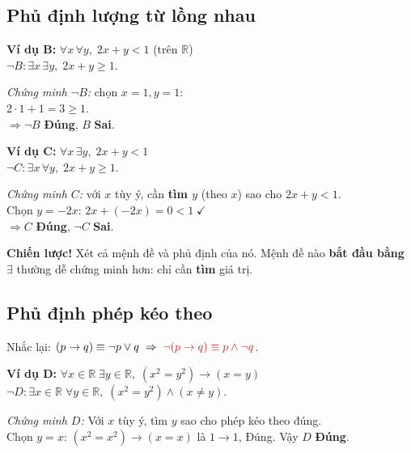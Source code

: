 \documentclass[12pt,a4paper]{article}
\begin{document}
\subsection{Phủ định lượng từ lồng nhau}

\noindent
\begin{minipage}[t]{0.47\textwidth}
\textbf{Ví dụ B:} $\forall x\,\forall y,\; 2x + y < 1$ (trên $\mathbb{R}$)\\
$\neg B : \exists x\,\exists y,\; 2x + y \ge 1$.

\textit{Chứng minh $\neg B$:} chọn $x = 1, y = 1$:\\
$2 \cdot 1 + 1 = 3 \ge 1$.\\
$\Rightarrow \neg B$ \textcolor{AccentGreen}{\textbf{Đúng}}, $B$ \textcolor{AccentRed}{\textbf{Sai}}.
\end{minipage}
\hfill
\begin{minipage}[t]{0.49\textwidth}
\textbf{Ví dụ C:} $\forall x\,\exists y,\; 2x + y < 1$\\
$\neg C : \exists x\,\forall y,\; 2x + y \ge 1$.

\textit{Chứng minh $C$:} với $x$ tùy ý, cần \textbf{tìm $y$} (theo $x$) sao cho $2x + y < 1$.\\
Chọn $y = -2x$: $2x + (-2x) = 0 < 1\;\checkmark$\\
$\Rightarrow C$ \textcolor{AccentGreen}{\textbf{Đúng}}, $\neg C$ \textcolor{AccentRed}{\textbf{Sai}}.
\end{minipage}

\vspace{6pt}
\textbf{\textcolor{AccentRed}{Chiến lược!}} Xét cả mệnh đề và phủ định của nó. Mệnh đề nào \textbf{bắt đầu bằng $\exists$} thường dễ chứng minh hơn: chỉ cần \textbf{tìm} giá trị.

\subsection{Phủ định phép kéo theo}

Nhắc lại: $(p \to q) \equiv \neg p \lor q \;\Rightarrow\; \textcolor{AccentRed}{\neg(p \to q) \equiv p \land \neg q}$.

\textbf{Ví dụ D:} $\forall x \in \mathbb{R}\;\exists y \in \mathbb{R},\; (x^2 = y^2) \to (x = y)$\\
$\neg D : \exists x \in \mathbb{R}\;\forall y \in \mathbb{R},\; (x^2 = y^2) \land (x \neq y)$.

\textit{Chứng minh $D$:} Với $x$ tùy ý, tìm $y$ sao cho phép kéo theo đúng.\\
Chọn $y = x$: $(x^2 = x^2) \to (x = x)$ là $1 \to 1$, Đúng. Vậy $D$ \textbf{Đúng}.
\end{document}
